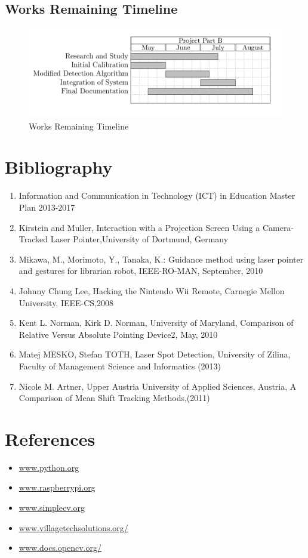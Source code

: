\documentclass[12pt, a4paper]{article}
\begin{document}
\subsection{Works Remaining Timeline}
\begin{figure}[htp]
\centering
\includegraphics[scale=0.35]{final.png}
\caption{Works Remaining Timeline}
\label{}
\end{figure}
\newpage
\section{Bibliography}
\begin{enumerate}
\item Information and Communication in Technology (ICT) in Education Master Plan 2013-2017 
\item Kirstein and Muller, Interaction with a Projection Screen Using a Camera-Tracked Laser Pointer,University of Dortmund, Germany
\item Mikawa, M., Morimoto, Y., Tanaka, K.: Guidance method using laser pointer and gestures for librarian robot, IEEE-RO-MAN, September, 2010
\item Johnny Chung Lee, Hacking the Nintendo Wii Remote, Carnegie Mellon University, IEEE-CS,2008 
\item Kent L. Norman, Kirk D. Norman, University of Maryland, Comparison of Relative Versus Absolute Pointing Device2, May, 2010
\item Matej MESKO, Stefan TOTH, Laser Spot Detection, University of Zilina, Faculty of Management Science and Informatics (2013) 
\item Nicole M. Artner, Upper Austria University of Applied Sciences, Austria, A Comparison of Mean Shift Tracking Methods,(2011)
\end{enumerate}

\section{References}
\begin{itemize}
	\item \url{www.python.org}
	\item \url{www.raspberrypi.org}
	\item \url{www.simplecv.org}
	\item \url{www.villagetechsolutions.org/}
	\item \url{www.docs.opencv.org/}
\end{itemize}
\end{document}
